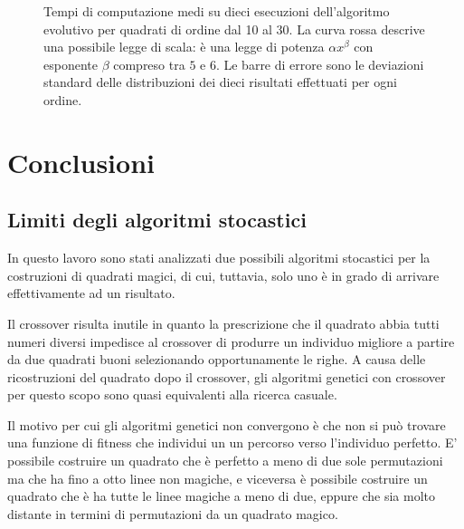 \documentclass[italian,twoside,twocolumn]{article}
\begin{document}
\begin{figure}[htbp]
	\centering
	\caption{Tempi di computazione medi su dieci esecuzioni dell'algoritmo evolutivo per quadrati di ordine dal 10 al 30. La curva rossa descrive una possibile legge di scala: è una legge di potenza $ \alpha x^{\beta} $ con esponente $ \beta $ compreso tra $ 5 $ e $ 6 $. Le barre di errore sono le deviazioni standard delle distribuzioni dei dieci risultati effettuati per ogni ordine.	}
	\label{fig:scala_xie_kang}
\end{figure}

\section{Conclusioni}

\subsection{Limiti degli algoritmi stocastici}
In questo lavoro sono stati analizzati due possibili algoritmi stocastici per la costruzioni di quadrati magici, di cui, tuttavia, solo uno è in grado di arrivare effettivamente ad un risultato. 

Il crossover risulta inutile in quanto la prescrizione che il quadrato abbia tutti numeri diversi impedisce al crossover di produrre un individuo migliore a partire da due quadrati buoni selezionando opportunamente le righe. A causa delle ricostruzioni del quadrato dopo il crossover, gli algoritmi genetici con crossover per questo scopo sono quasi equivalenti alla ricerca casuale. 

Il motivo per cui gli algoritmi genetici non convergono è che non si può trovare una funzione di fitness che individui un un percorso verso l'individuo perfetto. E' possibile costruire un quadrato che è perfetto a meno di due sole permutazioni ma che ha fino a otto linee non magiche, e viceversa è possibile costruire un quadrato che è ha tutte le linee magiche a meno di due, eppure che sia molto distante in termini di permutazioni da un quadrato magico.
\end{document}
